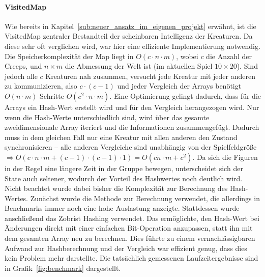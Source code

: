 \paragraph{VisitedMap} Wie bereits in Kapitel~\ref{sub:neuer_ansatz_im_eigenen_projekt} erwähnt, ist die VisitedMap zentraler Bestandteil der scheinbaren Intelligenz der Kreaturen. Da diese sehr oft verglichen wird, war hier eine effiziente Implementierung notwendig. Die Speicherkomplexität der Map liegt in \(O (c\cdot n \cdot m)\), wobei \(c\) die Anzahl der Creeps, und \(n\times m\) die Abmessung der Welt ist (im aktuellen Spiel \(10\times20\)). Sind jedoch alle \(c\) Kreaturen nah zusammen, versucht jede Kreatur mit jeder anderen zu kommunizieren, also \(c\cdot (c-1)\) und jeder Vergleich der Arrays benötigt \(O(n\cdot m)\) Schritte \(O(c^2\cdot n\cdot m)\). Eine Optimierung gelingt dadurch, dass für die Arrays ein Hash-Wert erstellt wird und für den Vergleich herangezogen wird. Nur wenn die Hash-Werte unterschiedlich sind, wird über das gesamte zweidimensionale Array iteriert und die Informationen zusammengefügt. Dadurch muss in dem gleichen Fall nur eine Kreatur mit allen anderen den Zustand synchronisieren -- alle anderen Vergleiche sind unabhängig von der Spielfeldgröße \(\Rightarrow O(c\cdot n \cdot m + (c-1)\cdot(c-1)\cdot1) = O(c \dot n \cdot m + c^2) \). Da sich die Figuren in der Regel eine längere Zeit in der Gruppe bewegen, unterscheidet sich der State auch seltener, wodurch der Vorteil des Hashwertes noch deutlich wird. Nicht beachtet wurde dabei bisher die Komplexität zur Berechnung des Hash-Wertes. Zunächst wurde die Methode  zur Berechnung verwendet, die allerdings in Benchmarks immer noch eine hohe Auslastung anzeigte. Stattdessen wurde anschließend das Zobrist Hashing  verwendet. Das ermöglichte, den Hash-Wert bei Änderungen direkt mit einer einfachen Bit-Operation anzupassen, statt ihn mit dem gesamten Array neu zu berechnen. Dies führte zu einem vernachlässigbaren Aufwand zur Hashberechnung und der Vergleich war effizient genug, dass dies kein Problem mehr darstellte. Die tatsächlich gemessenen Laufzeitergebnisse sind in Grafik~\ref{fig:benchmark} dargestellt.
